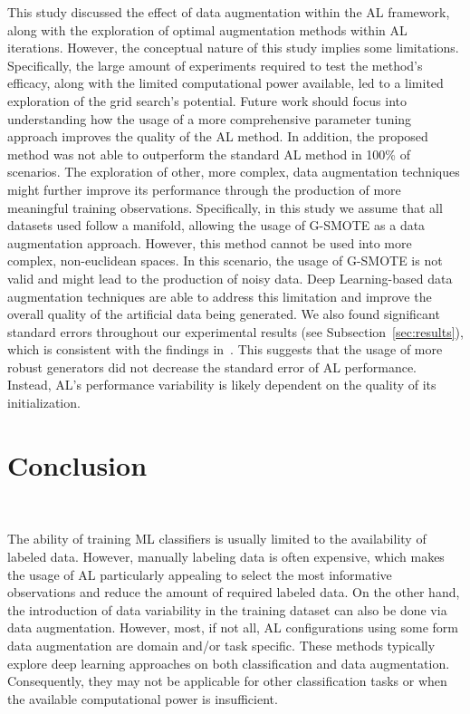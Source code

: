 \documentclass[preprint, 12pt]{elsarticle}
\begin{document}
This study discussed the effect of data augmentation within the AL framework,
along with the exploration of optimal augmentation methods within AL
iterations. However, the conceptual nature of this study implies some
limitations. Specifically, the large amount of experiments required to test
the method's efficacy, along with the limited computational power available,
led to a limited exploration of the grid search's potential. Future work
should focus into understanding how the usage of a more comprehensive
parameter tuning approach improves the quality of the AL method. In addition,
the proposed method was not able to outperform the standard AL method in 100\%
of scenarios. The exploration of other, more complex, data augmentation
techniques might further improve its performance through the production of
more meaningful training observations. Specifically, in this study we assume
that all datasets used follow a manifold, allowing the usage of G-SMOTE as a
data augmentation approach. However, this method cannot be used into more
complex, non-euclidean spaces. In this scenario, the usage of G-SMOTE is not
valid and might lead to the production of noisy data. Deep Learning-based data
augmentation techniques are able to address this limitation and improve the
overall quality of the artificial data being generated. We also found
significant standard errors throughout our experimental results (see
Subsection~\ref{sec:results}), which is consistent with the findings
in~\cite{Fonseca2021, Kottke2017}. This suggests that the usage of more robust
generators did not decrease the standard error of AL performance. Instead,
AL's performance variability is likely dependent on the quality of its
initialization.

\section{Conclusion}~\label{sec:conclusion}

The ability of training ML classifiers is usually limited to the availability
of labeled data. However, manually labeling data is often expensive, which
makes the usage of AL particularly appealing to select the most informative
observations and reduce the amount of required labeled data. On the other
hand, the introduction of data variability in the training dataset can also be
done via data augmentation. However, most, if not all, AL configurations using
some form data augmentation are domain and/or task specific. These methods
typically explore deep learning approaches on both classification and data
augmentation. Consequently, they may not be applicable for other
classification tasks or when the available computational power is
insufficient.
\end{document}

